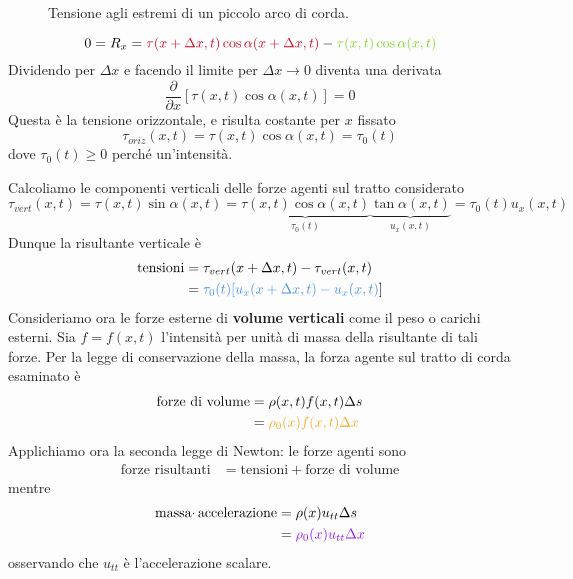 \documentclass[10pt,a4paper,twoside,openright]{book}
\begin{document}
\begin{figure}[htpb]
\begin{tikzpicture}[x=0.75pt,y=0.75pt,yscale=-1,xscale=1]
	\end{tikzpicture}
	\caption{Tensione agli estremi di un piccolo arco di corda.}
\end{figure}
\FloatBarrier



\begin{equation*}
0=R_{x} =\textcolor[rgb]{0.82,0.01,0.11}{\tau ( x+\Delta x,t)\cos \alpha ( x+\Delta x,t)} -\textcolor[rgb]{0.49,0.83,0.13}{\tau ( x,t)\cos \alpha ( x,t)}
\end{equation*}
Dividendo per $\displaystyle \Delta x$ e facendo il limite per $\displaystyle \Delta x\rightarrow 0$ diventa una derivata
\begin{equation*}
\frac{\partial }{\partial x}[ \tau ( x,t)\cos \alpha ( x,t)] =0
\end{equation*}
Questa è la tensione orizzontale, e risulta costante per $\displaystyle x$ fissato
\begin{equation*}
\tau _{oriz}( x,t) =\tau ( x,t)\cos \alpha ( x,t) =\tau _{0}( t)
\end{equation*}
dove $\displaystyle \tau _{0}( t) \geqslant 0$ perché un'intensità.

Calcoliamo le componenti verticali delle forze agenti sul tratto considerato
\begin{equation*}
\tau _{vert}( x,t) =\tau ( x,t)\sin \alpha ( x,t) =\underbrace{\tau ( x,t)\cos \alpha ( x,t)}_{\tau _{0}( t)}\underbrace{\tan \alpha ( x,t)}_{u_{x}( x,t)} =\tau _{0}( t) u_{x}( x,t)
\end{equation*}
Dunque la risultante verticale è
\begin{align*}
\text{tensioni} & =\tau _{vert}( x+\Delta x,t) -\tau _{vert}( x,t)\\
 & =\textcolor[rgb]{0.29,0.56,0.89}{\tau _{0}( t)[ u_{x}( x+\Delta x,t) -u_{x}( x,t)}]
\end{align*}
Consideriamo ora le forze esterne di \textbf{volume} \textbf{verticali} come il peso o carichi esterni. Sia $\displaystyle f=f( x,t)$ l'intensità per unità di massa della risultante di tali forze. Per la legge di conservazione della massa, la forza agente sul tratto di corda esaminato è
\begin{align*}
\text{forze di volume} & =\rho ( x,t) f( x,t) \Delta s\\
 & =\textcolor[rgb]{0.96,0.65,0.14}{\rho _{0}( x) f( x,t) \Delta x}
\end{align*}
Applichiamo ora la seconda legge di Newton: le forze agenti sono
\begin{align*}
\text{forze risultanti} & =\text{tensioni} +\text{forze di volume}
\end{align*}
mentre
\begin{align*}
\text{massa} \cdotp \text{accelerazione} & =\rho ( x) u_{tt} \Delta s\\
 & =\textcolor[rgb]{0.56,0.07,1}{\rho _{0}( x) u_{tt} \Delta x}
\end{align*}
osservando che $\displaystyle u_{tt}$ è l'accelerazione scalare.
\end{document}
